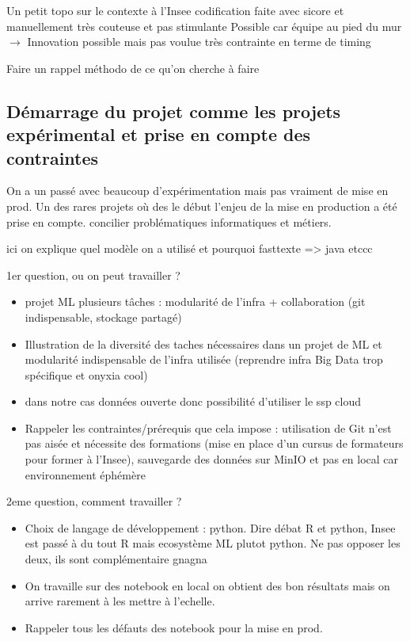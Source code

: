 Un petit topo sur le contexte à l'Insee codification faite avec sicore et manuellement très couteuse et pas stimulante
Possible car équipe au pied du mur $\rightarrow$ Innovation possible mais pas voulue très contrainte en terme de timing

Faire un rappel méthodo de ce qu'on cherche à faire

\subsection{Démarrage du projet comme les projets expérimental et prise en compte des contraintes}

On a un passé avec beaucoup d'expérimentation mais pas vraiment de mise en prod. Un des rares projets où des le début l'enjeu de la mise en production a été prise en compte. concilier problématiques
informatiques et métiers.

ici on explique quel modèle on a utilisé et pourquoi fasttexte => java etccc

1er question, ou on peut travailler ? 
\begin{itemize}

    \item projet ML plusieurs tâches : modularité de l'infra + collaboration (git indispensable, stockage partagé)
    \item Illustration de la diversité des taches nécessaires dans un projet de ML et modularité indispensable de l'infra utilisée (reprendre infra Big Data trop spécifique et onyxia cool)
    \item dans notre cas données ouverte donc possibilité d'utiliser le ssp cloud
    \item Rappeler les contraintes/prérequis que cela impose : utilisation de Git n'est pas aisée et nécessite des formations (mise en place d'un cursus de formateurs pour former à l'Insee), sauvegarde des données sur MinIO et pas en  local car environnement éphémère
\end{itemize}

2eme question, comment travailler ?
\begin{itemize}
    \item Choix de langage de développement : python. Dire débat R et python, Insee est passé à du tout R mais ecosystème ML plutot python. Ne pas opposer les deux, ils sont complémentaire gnagna
    \item On travaille sur des notebook en local on obtient des bon résultats mais on arrive rarement à les mettre à l'echelle. 
    \item Rappeler tous les défauts des notebook pour la mise en prod. 
\end{itemize}


